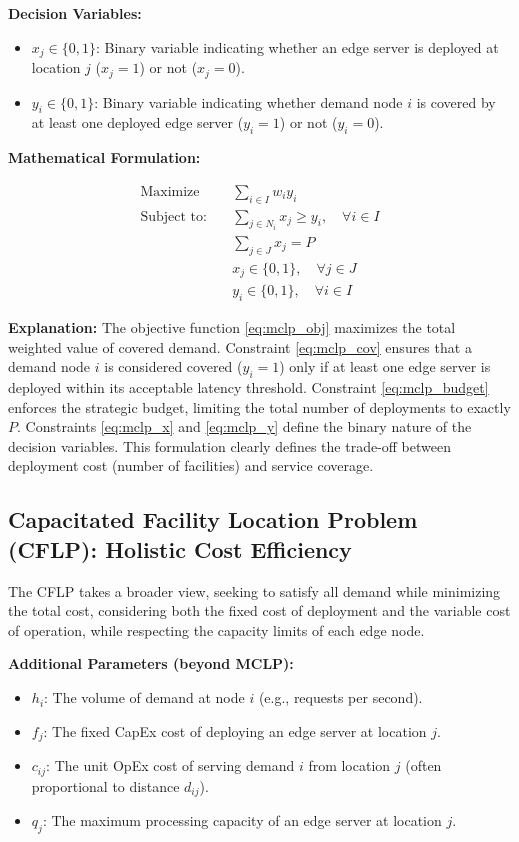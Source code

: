 \documentclass[11pt,a4paper]{article}
\begin{document}
\textbf{Decision Variables:}
\begin{itemize}
    \item $x_j \in \{0, 1\}$: Binary variable indicating whether an edge server is deployed at location $j$ ($x_j=1$) or not ($x_j=0$).
    \item $y_i \in \{0, 1\}$: Binary variable indicating whether demand node $i$ is covered by at least one deployed edge server ($y_i=1$) or not ($y_i=0$).
\end{itemize}

\textbf{Mathematical Formulation:}

\begin{align}
    \text{Maximize} \quad & \sum_{i \in I} w_i y_i \label{eq:mclp_obj} \\
    \text{Subject to:} \quad & \sum_{j \in N_i} x_j \geq y_i, \quad \forall i \in I \label{eq:mclp_cov} \\
    & \sum_{j \in J} x_j = P \label{eq:mclp_budget} \\
    & x_j \in \{0, 1\}, \quad \forall j \in J \label{eq:mclp_x} \\
    & y_i \in \{0, 1\}, \quad \forall i \in I \label{eq:mclp_y}
\end{align}

\textbf{Explanation:} The objective function \eqref{eq:mclp_obj} maximizes the total weighted value of covered demand. Constraint \eqref{eq:mclp_cov} ensures that a demand node $i$ is considered covered ($y_i = 1$) only if at least one edge server is deployed within its acceptable latency threshold. Constraint \eqref{eq:mclp_budget} enforces the strategic budget, limiting the total number of deployments to exactly $P$. Constraints \eqref{eq:mclp_x} and \eqref{eq:mclp_y} define the binary nature of the decision variables. This formulation clearly defines the trade-off between deployment cost (number of facilities) and service coverage.

\subsection{Capacitated Facility Location Problem (CFLP): Holistic Cost Efficiency}

The CFLP takes a broader view, seeking to satisfy all demand while minimizing the total cost, considering both the fixed cost of deployment and the variable cost of operation, while respecting the capacity limits of each edge node.

\textbf{Additional Parameters (beyond MCLP):}
\begin{itemize}
    \item $h_i$: The volume of demand at node $i$ (e.g., requests per second).
    \item $f_j$: The fixed CapEx cost of deploying an edge server at location $j$.
    \item $c_{ij}$: The unit OpEx cost of serving demand $i$ from location $j$ (often proportional to distance $d_{ij}$).
    \item $q_j$: The maximum processing capacity of an edge server at location $j$.
\end{itemize}
\end{document}
